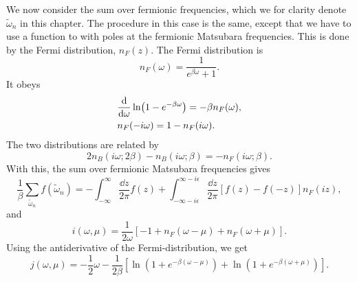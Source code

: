 We now consider the sum over fermionic frequencies, which we for clarity denote $\tilde \omega_n$ in this chapter.
The procedure in this case is the same, except that we have to use a function to with poles at the fermionic Matsubara frequencies.
This is done by the Fermi distribution, $n_F(z)$.
The Fermi distribution is
\begin{equation}
    n_F(\omega) = \frac{1}{e^{\beta \omega} + 1}.
\end{equation}
It obeys
\begin{align}
    &\diff{}{\omega} \ln(1 - e^{-\beta \omega}) = - \beta n_F(\omega), \\
    & n_F(- i\omega) = 1 - n_F(i\omega).
\end{align}
The two distributions are related by
\begin{equation}
    2 n_B(i \omega; 2\beta) - n_B(i \omega; \beta)
    = - n_F(i \omega; \beta ).
\end{equation}
With this, the sum over fermionic Matsubara frequencies gives
\begin{equation}
    \frac{1}{\beta} \sum_{\tilde \omega_n} f(\tilde \omega_n) 
    = 
    -\int_{-\infty}^{\infty} \frac{\dd z}{2 \pi} f(z)
    +
    \int_{-\infty - i \epsilon}^{\infty - i \epsilon}\frac{\dd z}{2 \pi}
    \left[
        f(z) - f(-z)
    \right]
    n_F(iz),
\end{equation}
and 
\begin{equation}
    i(\omega, \mu) = \frac{1}{2 \omega} [-1 + n_F(\omega - \mu) + n_F(\omega + \mu)].
\end{equation}
Using the antiderivative of the Fermi-distribution, we get
\begin{equation}
    j(\omega, \mu) 
    = - \frac{1}{2} \omega 
    - \frac{1}{2 \beta }
    \left[
        \ln\left(1 + e^{-\beta(\omega - \mu)}\right)
        + \ln\left(1 + e^{-\beta(\omega + \mu)}\right)
    \right].
\end{equation}


